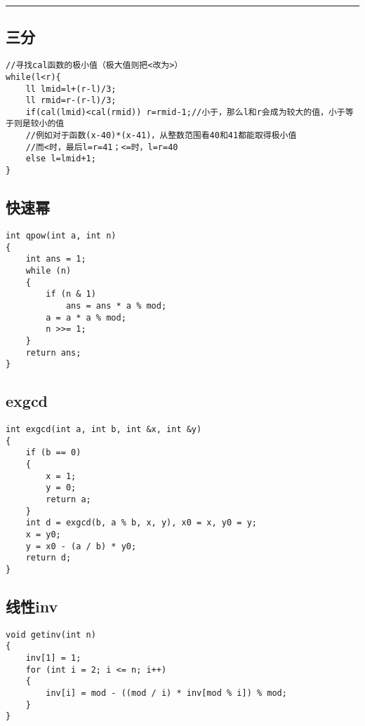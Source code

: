 \documentclass[]{article}
\begin{document}
\begin{center}\rule{0.5\linewidth}{0.5pt}\end{center}

\hypertarget{ux4e09ux5206-1}{%
\subsection{三分}\label{ux4e09ux5206-1}}

\begin{verbatim}
//寻找cal函数的极小值（极大值则把<改为>）
while(l<r){
    ll lmid=l+(r-l)/3;
    ll rmid=r-(r-l)/3;
    if(cal(lmid)<cal(rmid)) r=rmid-1;//小于，那么l和r会成为较大的值，小于等于则是较小的值
    //例如对于函数(x-40)*(x-41)，从整数范围看40和41都能取得极小值
    //而<时，最后l=r=41；<=时，l=r=40
    else l=lmid+1;
}
\end{verbatim}

\hypertarget{ux5febux901fux5e42}{%
\subsection{快速幂}\label{ux5febux901fux5e42}}

\begin{verbatim}
int qpow(int a, int n)
{
    int ans = 1;
    while (n)
    {
        if (n & 1)
            ans = ans * a % mod;
        a = a * a % mod;
        n >>= 1;
    }
    return ans;
}
\end{verbatim}

\hypertarget{exgcd}{%
\subsection{exgcd}\label{exgcd}}

\begin{verbatim}
int exgcd(int a, int b, int &x, int &y)
{
    if (b == 0)
    {
        x = 1;
        y = 0;
        return a;
    }
    int d = exgcd(b, a % b, x, y), x0 = x, y0 = y;
    x = y0;
    y = x0 - (a / b) * y0;
    return d;
}
\end{verbatim}

\hypertarget{ux7ebfux6027inv}{%
\subsection{线性inv}\label{ux7ebfux6027inv}}

\begin{verbatim}
void getinv(int n)
{
    inv[1] = 1;
    for (int i = 2; i <= n; i++)
    {
        inv[i] = mod - ((mod / i) * inv[mod % i]) % mod;
    }
}
\end{verbatim}
\end{document}
